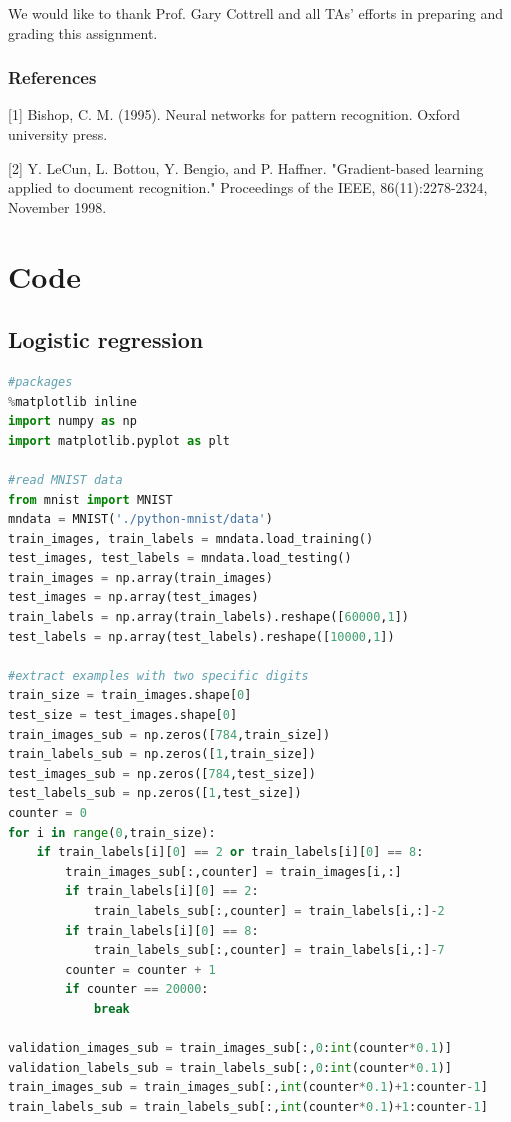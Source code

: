 \documentclass{article} %
\begin{document}
We would like to thank Prof. Gary Cottrell and all TAs' efforts in preparing and grading this assignment.

\subsubsection*{References}

\small{
[1] Bishop, C. M. (1995). Neural networks for pattern recognition. Oxford university press.

[2] Y. LeCun, L. Bottou, Y. Bengio, and P. Haffner. "Gradient-based learning applied to document recognition." Proceedings of the IEEE, 86(11):2278-2324, November 1998.

\section{Code}

\subsection{Logistic regression}
\begin{lstlisting}[language=Python]
#packages
%matplotlib inline
import numpy as np
import matplotlib.pyplot as plt

#read MNIST data
from mnist import MNIST
mndata = MNIST('./python-mnist/data')
train_images, train_labels = mndata.load_training()
test_images, test_labels = mndata.load_testing()
train_images = np.array(train_images)
test_images = np.array(test_images)
train_labels = np.array(train_labels).reshape([60000,1])
test_labels = np.array(test_labels).reshape([10000,1])

#extract examples with two specific digits
train_size = train_images.shape[0]
test_size = test_images.shape[0]
train_images_sub = np.zeros([784,train_size])
train_labels_sub = np.zeros([1,train_size])
test_images_sub = np.zeros([784,test_size])
test_labels_sub = np.zeros([1,test_size])
counter = 0
for i in range(0,train_size):
    if train_labels[i][0] == 2 or train_labels[i][0] == 8:
        train_images_sub[:,counter] = train_images[i,:]
        if train_labels[i][0] == 2:
            train_labels_sub[:,counter] = train_labels[i,:]-2
        if train_labels[i][0] == 8:
            train_labels_sub[:,counter] = train_labels[i,:]-7
        counter = counter + 1
        if counter == 20000:
            break
        
validation_images_sub = train_images_sub[:,0:int(counter*0.1)]
validation_labels_sub = train_labels_sub[:,0:int(counter*0.1)]
train_images_sub = train_images_sub[:,int(counter*0.1)+1:counter-1]
train_labels_sub = train_labels_sub[:,int(counter*0.1)+1:counter-1]


\end{lstlisting}}
\end{document}
